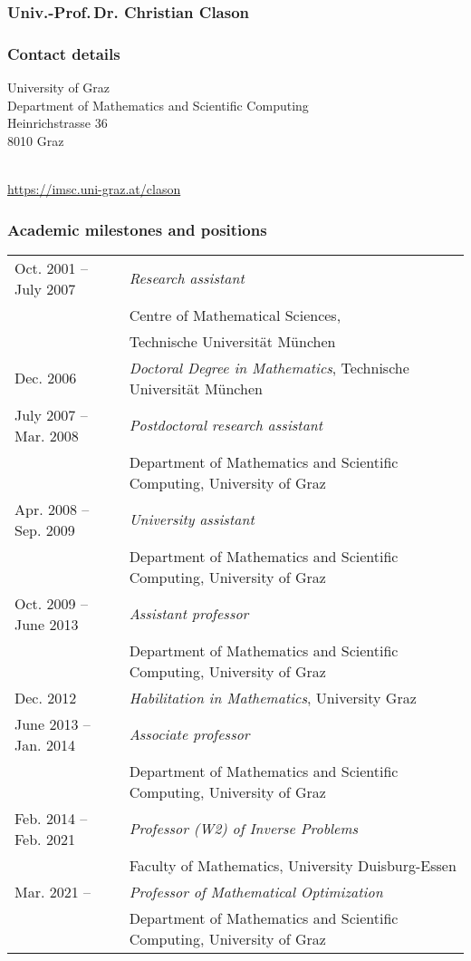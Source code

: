 \subsubsection*{Univ.-Prof.\,Dr. Christian Clason}
\label{cv:cclason}

\subsubsection*{Contact details}

University of Graz\\
Department of Mathematics and Scientific Computing\\
Heinrichstrasse 36\\
8010 Graz

\\
\url{https://imsc.uni-graz.at/clason}\\

\subsubsection*{Academic milestones and positions}

\enlargethispage{1cm}
\begin{tabularx}{\linewidth}{ll}
    Oct. 2001 -- July 2007 & \emph{Research assistant} \\
    & Centre of Mathematical Sciences, \\&Technische Universität München \\
    Dec. 2006 & \emph{Doctoral Degree in Mathematics}, Technische Universität München\\
    July  2007 -- Mar. 2008 & \emph{Postdoctoral research assistant}  \\
    & Department of Mathematics and Scientific Computing, University of Graz\\
    Apr.  2008 -- Sep. 2009 & \emph{University assistant}  \\
    & Department of Mathematics and Scientific Computing, University of Graz\\
    Oct.  2009 -- June 2013 & \emph{Assistant professor} \\
    & Department of Mathematics and Scientific Computing, University of Graz\\
    Dec. 2012 & \emph{Habilitation in Mathematics}, University Graz\\
    June  2013 -- Jan. 2014 & \emph{Associate professor} \\
    & Department of Mathematics and Scientific Computing, University of Graz\\
    Feb.  2014 -- Feb. 2021  & \emph{Professor (W2) of Inverse Problems}\\
    & Faculty of Mathematics, University Duisburg-Essen\\
    Mar.  2021 -- & \emph{Professor of Mathematical Optimization} \\
    & Department of Mathematics and Scientific Computing, University of Graz \\
\end{tabularx}

